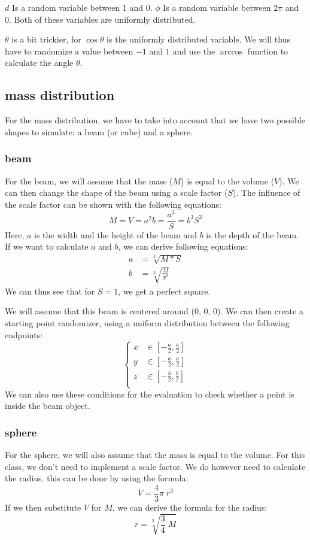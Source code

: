 $d$ Is a random variable between 1 and 0. $\phi$ Is a random variable between $2\pi$ and 0. Both of these variables are uniformly distributed.

$\theta$ is a bit trickier, for $\cos\theta$ is the uniformly distributed variable. We will thus have to randomize a value between $-1$ and $1$ and use the $\arccos$ function to  calculate the angle $\theta$.
\subsection{mass distribution}
For the mass distribution, we have to take into account that we have two possible shapes to simulate: a beam (or cube) and a sphere.
\subsubsection{beam} \label{beam}
For the beam, we will assume that the mass ($M$) is equal to the volume ($V$). We can then change the shape of the beam using a scale factor ($S$). The influence of the scale factor can be shown with the following equations:
\[M=V=a^2b=\frac{a^3}{S}=b^3S^2\]
Here, $a$ is the width and the height of the beam and $b$ is the depth of the beam. If we want to calculate $a$ and $b$, we can derive following equations:
\begin{align}
	a&=\sqrt[3]{M*S} \\
	b&=\sqrt[3]{\frac{M}{S^2}} \label{depth}
\end{align}
We can thus see that for $S=1$, we get a perfect square.

We will assume that this beam is centered around (0, 0, 0). We can then create a starting point randomizer, using a uniform distribution between the following endpoints:
\begin{displaymath}
	\begin{cases}
		x&\in\left[-\frac{a}{2}, \frac{a}{2}\right] \\
		y&\in\left[-\frac{a}{2}, \frac{a}{2}\right] \\
		z&\in\left[-\frac{b}{2}, \frac{b}{2}\right] \\
	\end{cases}
\end{displaymath}
We can also use these conditions for the evaluation to check whether a point is inside the beam object.
\subsubsection{sphere} \label{sphere}
For the sphere, we will also assume that the mass is equal to the volume. For this class, we don't need to implement a scale factor. We do however need to calculate the radius. this can be done by using the formula:
\[V=\frac{4}{3}\pi\;r^3\]
If we then substitute $V$ for $M$, we can derive the formula for the radius:
\begin{equation}
	r=\sqrt[3]{\frac{3}{4}\;M}
\end{equation}

